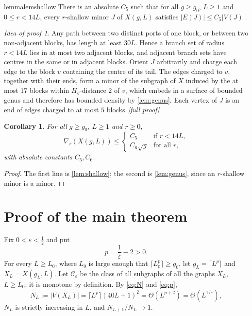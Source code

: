 \documentclass[11pt,a4paper]{article}
\theoremstyle{plain}
\newtheorem{corollary}[theorem]{Corollary}
\theoremstyle{definition}
\theoremstyle{remark}
\newtheorem*{proofidea}{Idea of proof}
\newcommand{\fullproofref}[1]{\,\hyperref[#1]{\textit{[full proof]}}}
\newcommand{\cC}{\mathcal C}
\begin{document}
\begin{restatable}{lemma}{lemshallow}\label{lem:shallow}
There is an absolute $C_5$ such that for all $g\ge g_0$, $L\ge1$ and $0\le r<14L$, every $r$-shallow minor $J$ of $X(g,L)$ satisfies $|E(J)|\le C_5|V(J)|$.
\end{restatable}
\begin{proofidea}
Any path between two distinct ports of one block, or between two non-adjacent blocks, has length at least $30L$. Hence a branch set of radius $r<14L$ lies in at most two adjacent blocks, and adjacent branch sets have centres in the same or in adjacent blocks. Orient $J$ arbitrarily and charge each edge to the block $v$ containing the centre of its tail. The edges charged to $v$, together with their ends, form a minor of the subgraph of $X$ induced by the at most $17$ blocks within $H_g$-distance $2$ of $v$, which embeds in a surface of bounded genus and therefore has bounded density by \cref{lem:genus}. Each vertex of $J$ is an end of edges charged to at most $5$ blocks.\fullproofref{pf:shallow}
\end{proofidea}

\begin{corollary}\label{cor:nabla}
For all $g\ge g_0$, $L\ge1$ and $r\ge0$,
\[
 \nabla_r(X(g,L))\le\begin{cases} C_5 & \text{if } r<14L,\\ C_6\sqrt g & \text{for all } r,\end{cases}
\]
with absolute constants $C_5,C_6$.
\end{corollary}
\begin{proof}
The first line is \cref{lem:shallow}; the second is \cref{lem:genus}, since an $r$-shallow minor is a minor.
\end{proof}

\section{Proof of the main theorem}\label{sec:proof-main}

Fix $0<\varepsilon<\frac12$ and put
\begin{equation}\label{eq:p}
 p=\frac1\varepsilon-2>0 .
\end{equation}
For every $L\ge L_0$, where $L_0$ is large enough that $\lceil L_0^p\rceil\ge g_0$, let $g_L=\lceil L^p\rceil$ and $X_L=X(g_L,L)$. Let $\cC_\varepsilon$ be the class of all subgraphs of all the graphs $X_L$, $L\ge L_0$; it is monotone by definition. By \eqref{eq:N} and \eqref{eq:p},
\begin{equation}\label{eq:NL}
 N_L:=|V(X_L)|=\lceil L^p\rceil(40L+1)^2=\Theta(L^{p+2})=\Theta(L^{1/\varepsilon}),
\end{equation}
$N_L$ is strictly increasing in $L$, and $N_{L+1}/N_L\to1$.
\end{document}
